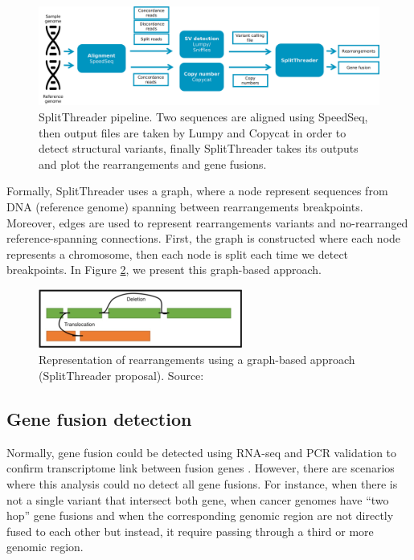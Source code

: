 \documentclass{svproc}
\begin{document}
\begin{figure}[h]
	\centering
	\includegraphics[width=\textwidth]{img/splitthreader/pipeline}
	\caption{SplitThreader pipeline. Two sequences are aligned using SpeedSeq, then output files are taken by Lumpy and Copycat in order to detect structural variants, finally SplitThreader takes its outputs and plot the rearrangements and gene fusions.}
	\label{fig:pipeline}
\end{figure}


Formally, SplitThreader uses a graph, where a node represent sequences from DNA (reference genome) spanning between rearrangements breakpoints. Moreover, edges are used to represent rearrangements variants and no-rearranged reference-spanning connections. First, the graph is constructed where each node represents a chromosome, then each node is split each time we detect breakpoints. In Figure \ref{fig:graph}, we present this graph-based approach. \\

\begin{figure}[h]
	\centering
	\includegraphics[width=0.6\textwidth]{img/splitthreader/graph}
	\caption{Representation of rearrangements using a graph-based approach (SplitThreader proposal). Source: \cite{nattestad2016splitthreader}}
	\label{fig:graph}
\end{figure}



\subsection{Gene fusion detection}
Normally, gene fusion could be detected using RNA-seq and PCR validation to confirm transcriptome link between fusion genes \cite{edgren2011identification}. However, there are scenarios where this analysis could no detect all gene fusions. For instance, when there is not a single variant that intersect both gene, when cancer genomes have ``two hop'' gene fusions and when the corresponding genomic region are not directly fused to each other but instead, it require passing through a third or more genomic region. \\
\end{document}
